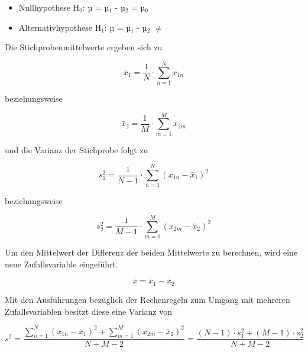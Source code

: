 \begin{itemize}
    \item Nullhypothese H$_{0}$: µ = µ$_{1}$ - µ$_{2}$ = µ$_{0}$
    \item Alternativhypothese H$_{1}$: µ = µ$_{1}$ - µ$_{2}$ $\neq$
\end{itemize}

\noindent Die Stichprobenmittelwerte ergeben sich zu

\begin{equation}\label{eq:sixonehundredfifteen}
\bar{x}_{1} =\dfrac{1}{N} \cdot \sum _{n=1}^{N}x_{1n}
\end{equation}

\noindent beziehungsweise

\begin{equation}\label{eq:sixonehundredsixteen}
\bar{x}_{2} =\dfrac{1}{M} \cdot \sum _{m=1}^{M}x_{2m}
\end{equation}

\noindent und die Varianz der Stichprobe folgt zu

\begin{equation}\label{eq:sixonehundredseventeen}
s_{1}^{2} =\dfrac{1}{N-1} \cdot \sum _{n=1}^{N}\left(x_{1n} -\bar{x}_{1} \right)^{2}
\end{equation}

\noindent beziehungsweise

\begin{equation}\label{eq:sixonehundredeighteen}
s_{2}^{2} =\dfrac{1}{M-1} \cdot \sum _{m=1}^{M}\left(x_{2m} -\bar{x}_{2} \right)^{2}
\end{equation}

\noindent Um den Mittelwert der Differenz der beiden Mittelwerte zu berechnen, wird eine neue Zufallsvariable eingef\"{u}hrt.

\begin{equation}\label{eq:sixonehundrednineteen}
\bar{x}=\bar{x}_{1} -\bar{x}_{2}
\end{equation}

\noindent Mit den Ausf\"{u}hrungen bez\"{u}glich der Rechenregeln zum Umgang mit mehreren Zufallsvariablen besitzt diese eine Varianz von

\begin{equation}\label{eq:sixonehundredtwenty}
s^{2} =\dfrac{\sum _{n=1}^{N}\left(x_{1n} -\bar{x}_{1} \right)^{2}  +\sum _{m=1}^{M}\left(x_{2m} -\bar{x}_{2} \right)^{2}  }{N+M-2} =\dfrac{\left(N-1\right)\cdot s_{1}^{2} +\left(M-1\right)\cdot s_{2}^{2} }{N+M-2}
\end{equation}

